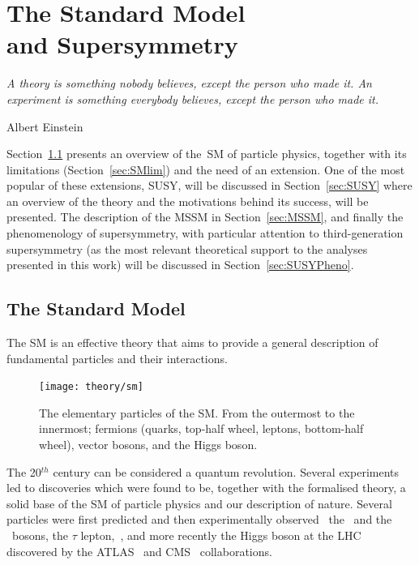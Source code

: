 \chapter[The Standard Model and Supersymmetry]{The Standard Model \protect\\and Supersymmetry}
\label{ch:theory} 
\epigraph{\emph{A theory is something nobody believes, except the person who made it. An experiment is something everybody believes, except the person who made it.}} {Albert Einstein}

	Section~\ref{sec:SMov} presents an overview of the~\ac{SM} of particle physics, together with its limitations (Section~\ref{sec:SMlim}) and the need of an extension. One of the most popular of these extensions, \ac{SUSY}, will be discussed in Section~\ref{sec:SUSY} where an overview of the theory and the motivations behind its success, will be presented. The description of the \ac{MSSM} in Section~\ref{sec:MSSM}, and finally the phenomenology of supersymmetry, with particular attention to third-generation supersymmetry (as the most relevant theoretical support to the analyses presented in this work) will be discussed in Section~\ref{sec:SUSYPheno}.



	\section{The Standard Model}
	\label{sec:SMov}

		The \ac{SM} is an effective theory that aims to provide a general description of fundamental particles and their interactions. %

		\begin{figure}
			\centering
				\texttt{[image: theory/sm]}
			\caption{\label{fig:sm_el_part} The elementary particles of the \ac{SM}. From the outermost to the innermost; fermions (quarks, top-half wheel, leptons, bottom-half wheel), vector bosons, and the Higgs boson.} %
		\end{figure}		

		The 20$^{th}$ century can be considered a quantum revolution. Several experiments led to discoveries which were found to be, together with the formalised theory, a solid base of the \ac{SM} of particle physics and our description of nature. Several particles were first predicted and then experimentally observed \eg\ the \Wboson\ and the \Zboson\ bosons, the $\tau$ lepton,~\cite{Herrero1998}, and more recently the Higgs boson at the \ac{LHC} discovered by the \acs{ATLAS}~\cite{ATLASHiggs2012} and \acs{CMS}~\cite{CMSHiggs2012} collaborations.

